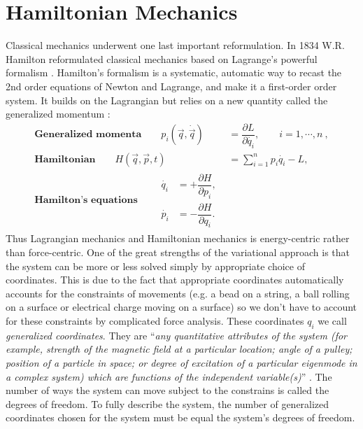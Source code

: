\section{Hamiltonian Mechanics}
Classical mechanics underwent one last important reformulation. In 1834 W.R. Hamilton reformulated classical mechanics based on Lagrange's powerful formalism \cite[p. 161]{Nakane2002}. Hamilton's formalism is a systematic, automatic way to recast the 2nd order equations of Newton and Lagrange, and make it a first-order order system. It builds on the Lagrangian but relies on a new quantity called the generalized momentum \cite{Hjorth2015}:
\begin{align}
\textbf{Generalized momenta} \qquad p_i(\vec{q},\dot{\vec{q}}) &= \dfrac{\partial L}{\partial \dot{q_i}}, \qquad i = 1,\cdots, n \ , \label{eq:generalized-momenta} \\[1cm]
\textbf{Hamiltonian} \qquad H(\vec{q}, \vec{p}, t) &= \sum\limits_{i=1}^n p_i \dot{q_i} - L \label{eq:hamiltonian}, \\[1cm]
\textbf{Hamilton's equations} \qquad
\begin{split}
\label{eq:hamiltons-equations}
\dot{q_i} &= +\dfrac{\partial H}{\partial p_i} ,
\\[0.2cm]
\dot{p_i} &= -\dfrac{\partial H}{\partial q_i}.
\end{split}
\end{align}
Thus Lagrangian mechanics and Hamiltonian mechanics is energy-centric rather than force-centric. One of the great strengths of the variational approach is that the system can be more or less solved simply by appropriate choice of coordinates. This is due to the fact that appropriate coordinates automatically accounts for the constraints of movements (e.g. a bead on a string, a ball rolling on a surface or electrical charge moving on a surface) so we don't have to account for these constraints by complicated force analysis. These coordinates $q_i$ we call \emph{generalized coordinates}. They are ``\emph{any quantitative attributes of the system (for example, strength of the magnetic field at a particular location; angle of a pulley; position of a particle in space; or degree of excitation of a particular eigenmode in a complex system) which are functions of the independent variable(s)}'' \cite{wiki-lag}. The number of ways the system can move subject to the constrains is called the degrees of freedom. To fully describe the system, the number of generalized coordinates chosen for the system must be equal the system's degrees of freedom.


